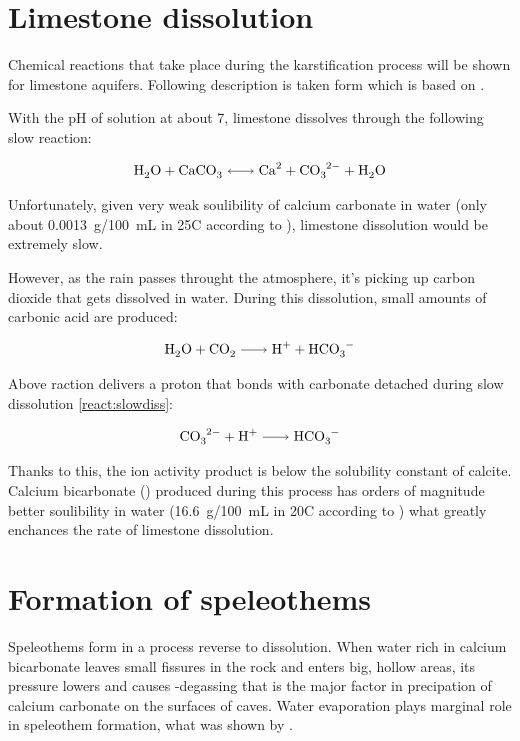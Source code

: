 \section{Limestone dissolution}

Chemical reactions that take place during the karstification process will be
shown for limestone aquifers. Following description is taken form \cite{dreybrodt2002}
which is based on \cite{plummer1978}.

With the pH of solution at about 7, limestone dissolves through the following
slow reaction:

\begin{equation}
  \cee{H2O + CaCO3 <-> Ca^2 + CO3^2- + H2O}
  \label{react:slowdiss}
\end{equation}

Unfortunately, given very weak soulibility of calcium carbonate in water (only
about 0.0013~g/100~mL in 25\degree C according to \cite{aylward2008si}),
limestone dissolution would be extremely slow.

However, as the rain passes throught the atmosphere, it's picking up carbon
dioxide that gets dissolved in water. During this dissolution, small amounts of
carbonic acid are produced:

\begin{equation}
  \cee{H2O + CO2 -> H^+ + HCO3^-}
\end{equation}

Above raction delivers a proton that bonds with carbonate detached during slow
dissolution \ref{react:slowdiss}:

\begin{equation}
  \ce{CO3^2- + H^+ -> HCO3^-}
\end{equation}

Thanks to this, the ion activity product   is below the
solubility constant of calcite. Calcium bicarbonate () produced
during this process has orders of magnitude better soulibility in water
(16.6~g/100~mL in 20\degree C according to \cite{aylward2008si}) what greatly
enchances the rate of limestone dissolution.

\section{Formation of speleothems}

Speleothems form in a process reverse to dissolution. When water rich in calcium
bicarbonate leaves small fissures in the rock and enters big, hollow areas, its
pressure lowers and causes -degassing that is the major factor in 
precipation of calcium carbonate on the surfaces of caves. Water evaporation
plays marginal role in speleothem formation, what was shown by \cite{holland1964cave}.
